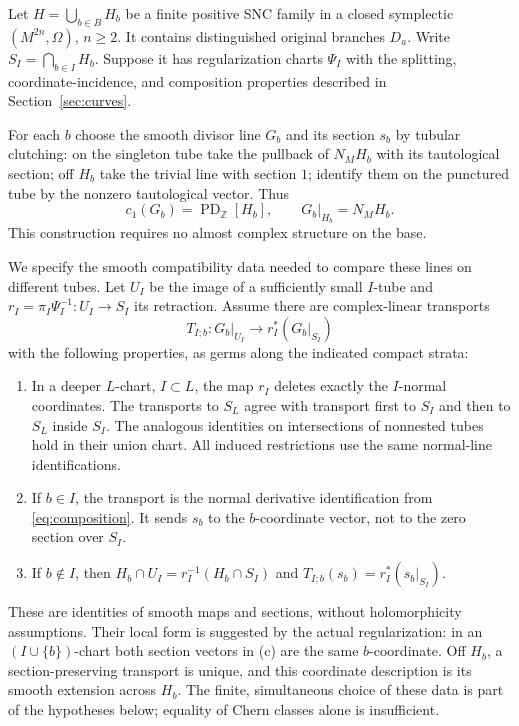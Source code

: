\documentclass[11pt]{article}
\theoremstyle{definition}
\theoremstyle{remark}
\newcommand{\Z}{\mathbb Z}
\newcommand{\PD}{\operatorname{PD}_{\Z}}
\begin{document}
Let $H=\bigcup_{b\in B}H_b$ be a finite positive SNC family in a closed symplectic $(M^{2n},\Omega)$, $n\geq2$. It contains distinguished original branches $D_a$. Write $S_I=\bigcap_{b\in I}H_b$. Suppose it has regularization charts $\Psi_I$ with the splitting, coordinate-incidence, and composition properties described in Section~\ref{sec:curves}.

For each $b$ choose the smooth divisor line $G_b$ and its section $s_b$ by tubular clutching: on the singleton tube take the pullback of $N_MH_b$ with its tautological section; off $H_b$ take the trivial line with section $1$; identify them on the punctured tube by the nonzero tautological vector. Thus
\begin{equation}\label{eq:G}
 c_1(G_b)=\PD[H_b],\qquad G_b|_{H_b}=N_MH_b.
\end{equation}
This construction requires no almost complex structure on the base.

We specify the smooth compatibility data needed to compare these lines on different tubes. Let $U_I$ be the image of a sufficiently small $I$-tube and $r_I=\pi_I\Psi_I^{-1}:U_I\to S_I$ its retraction. Assume there are complex-linear transports
\begin{equation}\label{eq:transport}
 T_{I;b}:G_b|_{U_I}\longrightarrow r_I^*(G_b|_{S_I})
\end{equation}
with the following properties, as germs along the indicated compact strata:
\begin{enumerate}[label=(\alph*),leftmargin=*]
\item In a deeper $L$-chart, $I\subset L$, the map $r_I$ deletes exactly the $I$-normal coordinates. The transports to $S_L$ agree with transport first to $S_I$ and then to $S_L$ inside $S_I$. The analogous identities on intersections of nonnested tubes hold in their union chart. All induced restrictions use the same normal-line identifications.
\item If $b\in I$, the transport is the normal derivative identification from \eqref{eq:composition}. It sends $s_b$ to the $b$-coordinate vector, not to the zero section over $S_I$.
\item If $b\notin I$, then $H_b\cap U_I=r_I^{-1}(H_b\cap S_I)$ and $T_{I;b}(s_b)=r_I^*(s_b|_{S_I})$.
\end{enumerate}
These are identities of smooth maps and sections, without holomorphicity assumptions. Their local form is suggested by the actual regularization: in an $(I\cup\{b\})$-chart both section vectors in (c) are the same $b$-coordinate. Off $H_b$, a section-preserving transport is unique, and this coordinate description is its smooth extension across $H_b$. The finite, simultaneous choice of these data is part of the hypotheses below; equality of Chern classes alone is insufficient.
\end{document}
